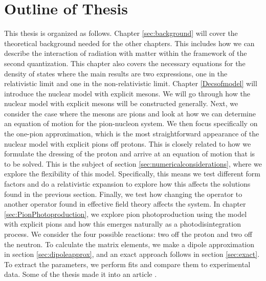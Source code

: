 \section{Outline of Thesis}
This thesis is organized as follows. Chapter \ref{sec:background} will cover the theoretical background needed for the other chapters. This includes how we can describe the interaction of radiation with matter within the framework of the second quantization. This chapter also covers the necessary equations for the density of states where the main results are two expressions, one in the relativistic limit and one in the non-relativistic limit. Chapter \ref{Decsofmodel} will introduce the nuclear model with explicit mesons. We will go through how the nuclear model with explicit mesons will be constructed generally. Next, we consider the case where the mesons are pions and look at how we can determine an equation of motion for the pion-nucleon system. We then focus specifically on the one-pion approximation, which is the most straightforward appearance of the nuclear model with explicit pions off protons. This is closely related to how we formulate the dressing of the proton and arrive at an equation of motion that is to be solved. This is the subject of section \ref{sec:numericalconsiderations}, where we explore the flexibility of this model. Specifically, this means we test different form factors and do a relativistic expansion to explore how this affects the solutions found in the previous section. Finally, we test how changing the operator to another operator found in effective field theory affects the system. In chapter \ref{sec:PionPhotoproduction}, we explore pion photoproduction using the model with explicit pions and how this emerges naturally as a photodisintegration process. We consider the four possible reactions: two off the proton and two off the neutron. To calculate the matrix elements, we make a dipole approximation in section \ref{sec:dipoleapprox}, and an exact approach follows in section \ref{sec:exact}. To extract the parameters, we perform fits and compare them to experimental data. Some of the thesis made it into an article \cite{ThresholdPion}.
